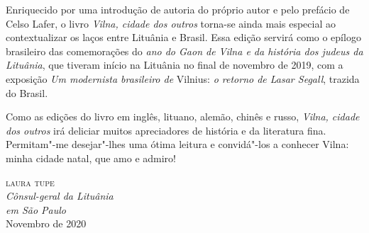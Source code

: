 Enriquecido por uma introdução de autoria do próprio autor e pelo 
prefácio de Celso Lafer, o livro \textit{Vilna, cidade
dos outros} torna-se ainda mais especial ao contextualizar 
os laços entre Lituânia e Brasil. Essa edição servirá como o epílogo 
brasileiro das comemorações do \textit{ano do Gaon de Vilna e da história
dos judeus da Lituânia}, que tiveram início na Lituânia no final de novembro de 2019, com a exposição
\textit{Um modernista brasileiro de} Vilnius: \textit{o retorno de
Lasar Segall}, trazida do Brasil.

Como as edições do livro em inglês, lituano, alemão,
chinês e russo, \textit{Vilna, cidade dos outros} irá deliciar muitos
apreciadores de história e da literatura fina. Permitam"-me desejar"-lhes
uma ótima leitura e convidá"-los a conhecer Vilna: minha cidade natal,
que amo e admiro!

\begin{flushright}
\textsc{laura tupe}\\
\textit{Cônsul-geral da Lituânia\\em São Paulo}\\
\medskip
\small Novembro de 2020
\end{flushright}